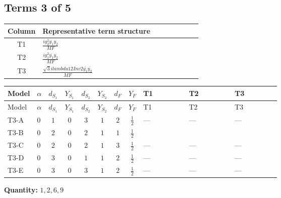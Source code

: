\documentclass[8pt]{article}
\begin{document}
\begin{landscape}
\subsection*{Terms 3 of 5}
\begin{center}
\begin{tabular}{@{}c >{\raggedright\arraybackslash}p{0.82\linewidth}@{}}
\toprule
Column & Representative term structure \\
\midrule
T1 & \(\displaystyle \frac{i g_{2}^{2} \overline{y_{1}} \overline{y_{2}}}{MF}\) \\
\midrule
T2 & \(\displaystyle \frac{i g_{1}^{2} \overline{y_{1}} \overline{y_{2}}}{MF}\) \\
\midrule
T3 & \(\displaystyle \frac{\sqrt{3} i lambda12Inv2 \overline{y_{1}} \overline{y_{2}}}{MF}\) \\
\midrule
\bottomrule
\end{tabular}
\end{center}
\smallskip
\tiny
\begin{longtable}{@{}llcccccc >{\raggedright\arraybackslash}p{0.21\linewidth} >{\raggedright\arraybackslash}p{0.21\linewidth} >{\raggedright\arraybackslash}p{0.21\linewidth}@{}}
\toprule
Model & $\alpha$ & $d_{S_1}$ & $Y_{S_1}$ & $d_{S_2}$ & $Y_{S_2}$ & $d_F$ & $Y_F$ & T1 & T2 & T3 \\
\midrule
\endfirsthead
\toprule
Model & $\alpha$ & $d_{S_1}$ & $Y_{S_1}$ & $d_{S_2}$ & $Y_{S_2}$ & $d_F$ & $Y_F$ & T1 & T2 & T3 \\
\midrule
\endhead
T3-A & $0$ & $1$ & $0$ & $3$ & $1$ & $2$ & $\frac{1}{2}$ & --- & --- & --- \\
\midrule
T3-B & $0$ & $2$ & $0$ & $2$ & $1$ & $1$ & $\frac{1}{2}$ & \scriptsize\adjustbox{max width=\linewidth}{$\begin{gathered} - \frac{3 i g_{2}^{2} \overline{y_{1}} \overline{y_{2}}}{8 MF}\end{gathered}$} & \scriptsize\adjustbox{max width=\linewidth}{$\begin{gathered} - \frac{3 i g_{1}^{2} \overline{y_{1}} \overline{y_{2}}}{16 MF}\end{gathered}$} & \scriptsize\adjustbox{max width=\linewidth}{$\begin{gathered} - \frac{\sqrt{3} i lambda12Inv2 \overline{y_{1}} \overline{y_{2}}}{6 MF}\end{gathered}$} \\
\midrule
T3-C & $0$ & $2$ & $0$ & $2$ & $1$ & $3$ & $\frac{1}{2}$ & --- & --- & --- \\
\midrule
T3-D & $0$ & $3$ & $0$ & $1$ & $1$ & $2$ & $\frac{1}{2}$ & --- & --- & --- \\
\midrule
T3-E & $0$ & $3$ & $0$ & $3$ & $1$ & $2$ & $\frac{1}{2}$ & --- & --- & --- \\
\midrule
\bottomrule
\end{longtable}
\clearpage
\noindent\textbf{Quantity: }$\mathrm{1,2,6,9}$\par\smallskip

\end{landscape}
\end{document}
